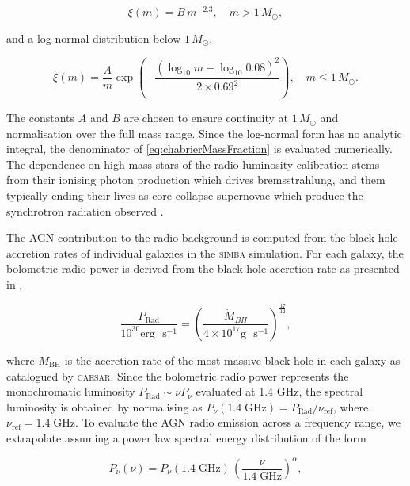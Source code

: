 \documentclass[
    a4paper, %
    10pt, %
    unnumberedsections, %
]{LTJournalArticle}
\begin{document}
\begin{equation}
    \xi(m) = B\,m^{-2.3}, \quad m > 1\,M_\odot,
    \label{eq:chabrierPowerLaw}
\end{equation}

\noindent and a log-normal distribution below $1\,M_\odot$,

\begin{equation}
    \xi(m) = \frac{A}{m}\exp{\left(-\frac{(\log_{10}m - \log_{10}0.08)^2}
    {2 \times 0.69^2}\right)}, 
    \quad m \leq 1\,M_\odot.
    \label{eq:chabrierLogNormal}
\end{equation}

\noindent The constants $A$ and $B$ are chosen to ensure continuity at $1\,M_\odot$ and normalisation over the full mass range. Since the log-normal form has no analytic integral, the denominator of \cref{eq:chabrierMassFraction} is evaluated numerically. The dependence on high mass stars of the radio luminosity calibration stems from their ionising photon production which drives bremsstrahlung, and them typically ending their lives as core collapse supernovae which produce the synchrotron radiation observed \parencite{shenoyWhatFactorsShape2026}.

The AGN contribution to the radio background is computed from the black hole accretion rates of individual galaxies in the \textsc{simba} simulation. For each galaxy, the bolometric radio power is derived from the black hole accretion rate as presented in \cite{kordingMeasuringAccretionRate2007},

\begin{equation}
    \frac{P_\mathrm{Rad}}{10^{30}\mathrm{erg}\text{ }\mathrm{s^{-1}}} = \left(\frac{\dot{M}_{BH}}{4\times10^{17}\mathrm{g}\text{ }\mathrm{s^{-1}}}\right)^\frac{17}{12},
    \label{agnRadioEmission}
\end{equation}

\noindent where $\dot{M}_{\mathrm{BH}}$ is the accretion rate of the most massive black hole in each galaxy as catalogued by \textsc{caesar}. Since the bolometric radio power represents the monochromatic luminosity $P_{\mathrm{Rad}} \sim \nu P_\nu$ evaluated at 1.4 GHz, the spectral luminosity is obtained by normalising as $P_\nu(1.4\;\mathrm{GHz}) = P_{\mathrm{Rad}} / \nu_{\mathrm{ref}}$, where $\nu_{\mathrm{ref}} = 1.4\;\mathrm{GHz}$. To evaluate the AGN radio emission across a frequency range, we extrapolate assuming a power law spectral energy distribution of the form

\begin{equation}
    P_\nu(\nu) = P_\nu(1.4\;\mathrm{GHz})\,\left(\frac{\nu}  {1.4\;\mathrm{GHz}}\right)^{\alpha},
\end{equation}
\end{document}

